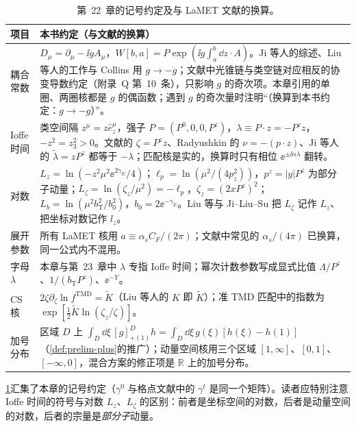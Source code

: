\begin{table}[htbp]
\centering
\small
\renewcommand{\arraystretch}{1.12}
\begin{tabularx}{\textwidth}{@{}p{2.3cm}X@{}}
\toprule
项目 & 本书约定（与文献的换算） \\
\midrule
耦合常数 & $D_\mu=\partial_\mu-\ii gA_\mu$，$W[b,a]=P\exp(\ii g\int_a^b\dd z\cdot A)$。Ji 等人的综述\cite{JiEtAl2021}、Liu 等人的工作与 Collins 用 $g\to-g$；文献\cite{IzubuchiEtAl2018}中光锥链与类空链对应相反的协变导数约定（附录~Q 第~10~条），只影响 $g$ 的奇次项。本章引用的单圈、两圈核都是 $g$ 的偶函数；遇到 $g$ 的奇次量时注明“（换算到本书约定：$g\to-g$）”。 \\
Ioffe 时间 & 类空间隔 $z^\mu=z\hat e_z^\mu$，强子 $P=(P^0,0,0,P^z)$，$\lambda\equiv P\cdot z=-P^zz$，$-z^2=z_3^2>0$。文献\cite{IzubuchiEtAl2018}的 $\zeta=P^zz$、Radyushkin 的 $\nu=-(p\cdot z)$、Ji 等人的 $\tilde\lambda=zP^z$ 都等于 $-\lambda$；匹配核是实的，换算时只有相位 $\ee^{\pm\ii\alpha\lambda}$ 翻转。 \\
对数 & $L_z=\ln(-z^2\mu^2\ee^{2\gamma_E}/4)$；$\ell_p=\ln(\mu^2/(4p_z^2))$，$p^z=|y|P^z$ 为部分子动量；$L_\zeta=\ln(\zeta_z/\mu^2)=-\ell_p$，$\zeta_z=(2xP^z)^2$；$L_b=\ln(\mu^2b_{\mathrm T}^2/b_0^2)$，$b_0=2\ee^{-\gamma_E}$。Liu 等与 Ji--Liu--Su 把 $L_\zeta$ 记作 $L_z$、把坐标对数记作 $l_z$。 \\
展开参数 & 所有 LaMET 核用 $a\equiv\alpha_sC_F/(2\pi)$；文献中常见的 $\alpha_s/(4\pi)$ 已换算，同一公式内不混用。 \\
字母 $\lambda$ & 本章与第~23~章中 $\lambda$ 专指 Ioffe 时间；幂次计数参数写成显式比值 $\Lambda/P^z$、$1/(b_{\mathrm T}P^z)$、$\ee^{-Y}$。 \\
CS 核 & $2\zeta\partial_\zeta\ln f^{\mathrm{TMD}}=\tilde K$（Liu 等人的 $K$ 即 $\tilde K$）；准 TMD 匹配中的指数为 $\exp[\frac12\tilde K\ln(\zeta_z/\zeta)]$。 \\
加号分布 & 区域 $D$ 上 $\int_D\dd\xi\,[g]^D_{+(1)}h=\int_D\dd\xi\,g(\xi)[h(\xi)-h(1)]$（\cref{def:prelim-plus}的推广）；动量空间核用三个区域 $[1,\infty]$、$[0,1]$、$[-\infty,0]$，混合方案的修正项是 $\mathbb R$ 上的加号分布。 \\
\bottomrule
\end{tabularx}
\caption{第~22~章的记号约定及与 LaMET 文献的换算。}
\label{tab:lamet-conventions}
\end{table}


\cref{tab:lamet-conventions}汇集了本章的记号约定（$\gamma^0$ 与格点文献中的 $\gamma^t$ 是同一个矩阵）。读者应特别注意 Ioffe 时间的符号与对数 $L_z$、$L_\zeta$ 的区别：前者是坐标空间的对数，后者是动量空间的对数，后者的宗量是\emph{部分子}动量。

